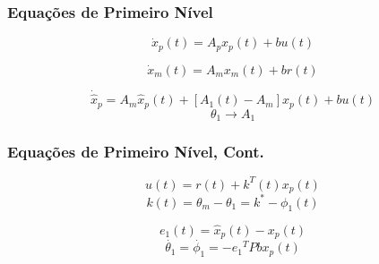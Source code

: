 \documentclass[aspectratio=169]{beamer}
\begin{document}
\begin{frame}
\frametitle{Equações de Primeiro Nível}




\centering
\begin{minipage}{.48\textwidth}
  \centering
\begin{equation}
\dot{x}_p(t) = A_p x_p(t) + b u(t)
\end{equation}

\begin{equation}
\dot{x}_m(t) = A_m x_m(t) + b r(t)
\end{equation}
\end{minipage}%
  \hfill
\begin{minipage}{.48\textwidth}
  \centering
\begin{equation}
\dot{\hat{x}}_p = A_m\hat{x}_p(t) + [A_1(t)-A_m]x_p(t) +bu(t)
\end{equation}
\begin{equation}
\theta_1 \rightarrow A_1 
\end{equation}

\end{minipage}



\end{frame}

\begin{frame}
\frametitle{Equações de Primeiro Nível, Cont.}

\centering
\begin{minipage}{.48\textwidth}
  \centering
\begin{equation}
u(t) = r(t) +k^T(t)x_p(t)
\end{equation}
\begin{equation}
k(t) = \theta_m - \theta_1 = k^* - \phi_1(t)
\end{equation}

\end{minipage}%
  \hfill
\begin{minipage}{.48\textwidth}
  \centering
\begin{equation}
e_1(t) = \hat{x}_p(t) - x_p(t)
\end{equation}
\begin{equation}
\dot{\theta_1} = \dot{\phi_1} = -{e_1}^TPbx_p(t)
\end{equation}

\end{minipage}

\end{frame}
\end{document}

